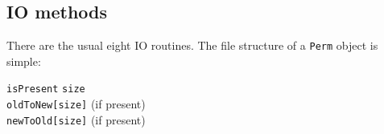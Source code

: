 \subsection{IO methods}
\label{subsection:Perm:proto:IO}
\par
There are the usual eight IO routines.
The file structure of a {\tt Perm} object is simple:
\begin{center}
\begin{tabbing}
{\tt isPresent} {\tt size} \\
{\tt oldToNew[size]} (if present) \\
{\tt newToOld[size]} (if present)
\end{tabbing}
\end{center}
\par
